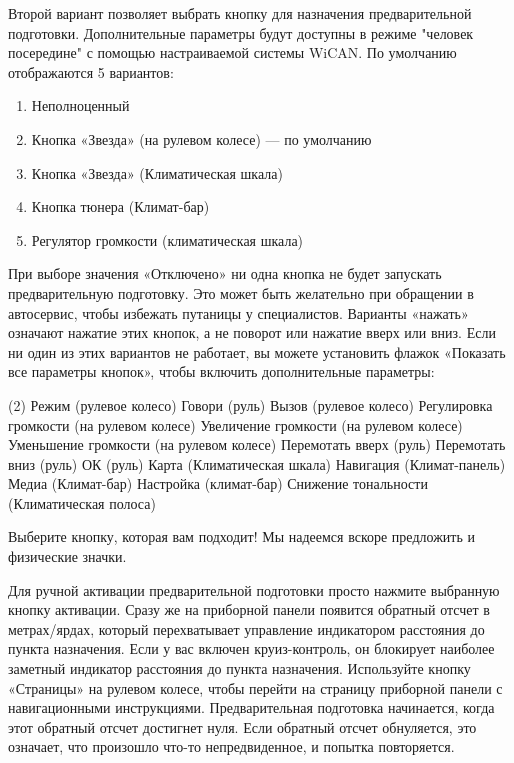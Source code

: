 \documentclass[superscriptaddress,onecolumn,floatfix]{revtex4-2}
\begin{document}
Второй вариант позволяет выбрать кнопку для назначения предварительной подготовки. Дополнительные параметры будут доступны в режиме "человек посередине" с помощью настраиваемой системы WiCAN. По умолчанию отображаются 5 вариантов:
\begin{enumerate}
  \item Неполноценный
  \item Кнопка «Звезда» (на рулевом колесе) — по умолчанию
  \item Кнопка «Звезда» (Климатическая шкала)
  \item Кнопка тюнера (Климат-бар)
  \item Регулятор громкости (климатическая шкала)
\end{enumerate}
При выборе значения «Отключено» ни одна кнопка не будет запускать предварительную подготовку. Это может быть желательно при обращении в автосервис, чтобы избежать путаницы у специалистов. Варианты «нажать» означают нажатие этих кнопок, а не поворот или нажатие вверх или вниз. Если ни один из этих вариантов не работает, вы можете установить флажок «Показать все параметры кнопок», чтобы включить дополнительные параметры:
\begin{tasks}(2)
  \task Режим (рулевое колесо)
  \task Говори (руль)
  \task Вызов (рулевое колесо)
  \task Регулировка громкости (на рулевом колесе)
  \task Увеличение громкости (на рулевом колесе)
  \task Уменьшение громкости (на рулевом колесе)
  \task Перемотать вверх (руль)
  \task Перемотать вниз (руль)
  \task ОК (руль)
  \task Карта (Климатическая шкала)
  \task Навигация (Климат-панель)
  \task Медиа (Климат-бар)
  \task Настройка (климат-бар)
  \task Снижение тональности (Климатическая полоса)
\end{tasks}
Выберите кнопку, которая вам подходит! Мы надеемся вскоре предложить и физические значки.

Для ручной активации предварительной подготовки просто нажмите выбранную кнопку активации. Сразу же на приборной панели появится обратный отсчет в метрах/ярдах, который перехватывает управление индикатором расстояния до пункта назначения. Если у вас включен круиз-контроль, он блокирует наиболее заметный индикатор расстояния до пункта назначения. Используйте кнопку «Страницы» на рулевом колесе, чтобы перейти на страницу приборной панели с навигационными инструкциями. Предварительная подготовка начинается, когда этот обратный отсчет достигнет нуля. Если обратный отсчет обнуляется, это означает, что произошло что-то непредвиденное, и попытка повторяется. 
\end{document}
